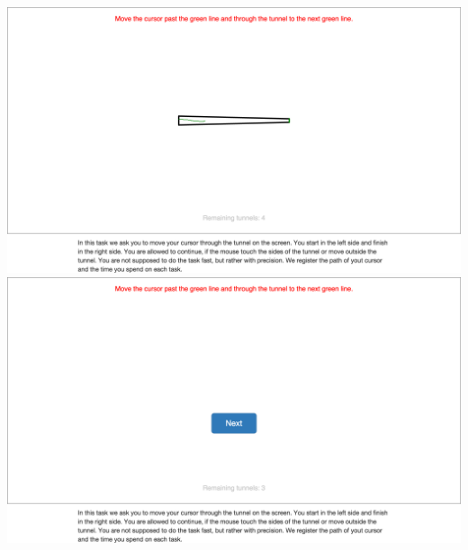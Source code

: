 \begin{appendices}
\begin{minipage}{\textwidth}
\centering
\includegraphics[width=\textwidth]{images/screenshots/ex_step_4_tunnel_path}
\label{fig:ex_step_4_tunnel_path}
\includegraphics[width=\textwidth]{images/screenshots/ex_step_4_tunnel_next}
\label{fig:ex_step_4_tunnel_next}
\end{minipage}


\end{appendices}

